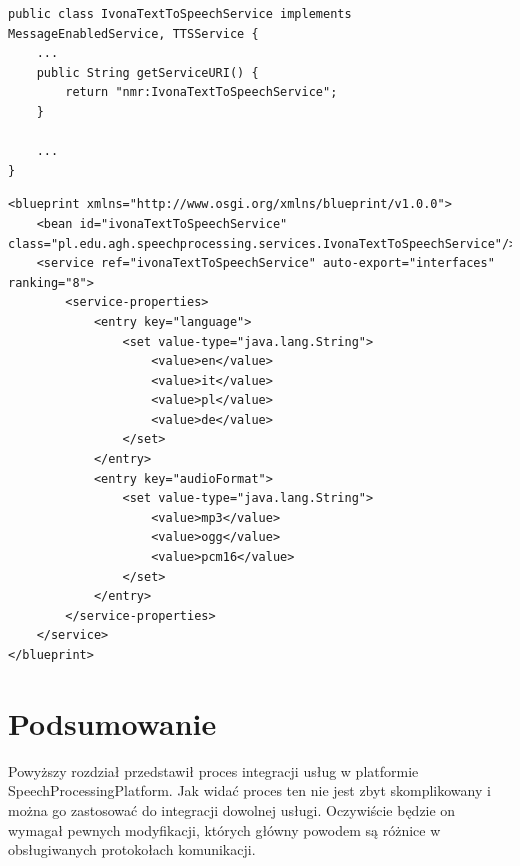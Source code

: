 \lstset{language=Java, tabsize=4, caption=Implementacja metody z interfejsu MessageEnabledService. ,label=lst:ivona_message}

\begin{minipage}{\linewidth}
\begin{center}
\begin{lstlisting}
public class IvonaTextToSpeechService implements MessageEnabledService, TTSService {
	...
	public String getServiceURI() {
		return "nmr:IvonaTextToSpeechService";
	}

	...
}
\end{lstlisting}
\end{center} 
\end{minipage}

\lstset{language=XML, tabsize=4, caption=Rejestracja komponentu IvonaTextToSpeechService w rejestrze OSGi przy użyciu kontenera Blueprint.,label=lst:ivona_blueprint_definition}

\begin{center}
\begin{lstlisting}
<blueprint xmlns="http://www.osgi.org/xmlns/blueprint/v1.0.0">
	<bean id="ivonaTextToSpeechService" class="pl.edu.agh.speechprocessing.services.IvonaTextToSpeechService"/>
	<service ref="ivonaTextToSpeechService" auto-export="interfaces" ranking="8">
		<service-properties>
			<entry key="language">
				<set value-type="java.lang.String">
					<value>en</value>
					<value>it</value>
					<value>pl</value>
					<value>de</value>
				</set> 
			</entry>
			<entry key="audioFormat">
				<set value-type="java.lang.String">
					<value>mp3</value>
					<value>ogg</value>
					<value>pcm16</value>
				</set> 
			</entry>
		</service-properties>
	</service>
</blueprint>

\end{lstlisting}
\end{center}

\section*{Podsumowanie} 
Powyższy rozdział przedstawił proces integracji usług w platformie SpeechProcessingPlatform. Jak widać proces ten nie jest zbyt skomplikowany i można go zastosować do integracji dowolnej usługi. Oczywiście będzie on wymagał pewnych modyfikacji, których główny powodem są różnice w obsługiwanych protokołach komunikacji.

 




 







